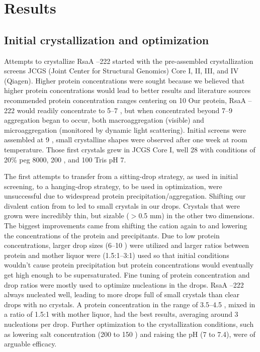 \section{Results}\label{sec:crystal-results}

\subsection{Initial crystallization and optimization}\label{sec:init-cryst-optim} 
 Attempts to crystallize RsaA --222 started with the pre-assembled crystallization screens JCGS (Joint Center for Structural Genomics) Core I, II, III, and IV (Qiagen). Higher protein concentrations were sought because we believed that higher protein concentrations would lead to better results and literature sources recommended protein concentration ranges centering on 10 \mgperml{} Our protein, RsaA --222 would readily concentrate to 5--7 \mgperml, but when concentrated beyond 7--9 \mgperml aggregation began to occur, both macroaggregation (visible) and microaggregation (monitored by dynamic light scattering). Initial screens were assembled at 9 \mgperml, small crystalline shapes were observed after one week at room temperature. Those first crystals grew in JCGS Core I, well 28 with conditions of 20\% \ac{peg} 8000, 200 \millimolar {}, and 100 \millimolar Tris pH 7.
 
The first attempts to transfer from a sitting-drop strategy, as used in initial screening, to a hanging-drop strategy, to be used in optimization, were unsuccessful due to widespread protein precipitation/aggregation. Shifting our divalent cation from  to  led to small crystals in our drops. Crystals that were grown  were incredibly thin, but sizable ($>$0.5 \si{\milli\meter}) in the other two dimensions. The biggest improvements came from shifting the cation again to  and lowering the concentrations of the protein and precipitants. Due to low protein concentrations, larger drop sizes (6--10 \microlitre) were utilized and larger ratios between protein and mother liquor were (1.5:1--3:1) used so that initial conditions wouldn't cause protein precipitation but protein concentrations would eventually get high enough to be supersaturated. Fine tuning of protein concentration and drop ratios were mostly used to optimize nucleations in the drops. RsaA --222 always nucleated well, leading to more drops full of small crystals than clear drops with no crystals. A protein concentration in the range of 3.5--4.5 \mgperml, mixed in a ratio of 1.5:1 with mother liquor, had the best results, averaging around 3 nucleations per drop. Further optimization to the crystallization conditions, such as lowering salt concentration (200 \millimolar to 150 \millimolar) and raising the pH (7 to 7.4), were of arguable efficacy. 

